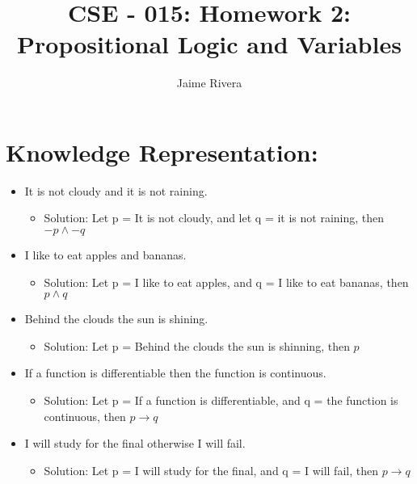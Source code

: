 \documentclass[11pt]{article}
\title{CSE - 015: Homework 2: Propositional Logic and Variables}
\author{Jaime Rivera}
\begin{document}
\maketitle

\section{Knowledge Representation:}

\begin{itemize}
\item It is not cloudy and it is not raining. 

\begin{itemize}
\item Solution: Let p = It is not cloudy, and let q = it is not raining, then $ -p \wedge -q$
 \end{itemize} 


\item I like to eat apples and bananas.

\begin{itemize}
\item Solution: Let p = I like to eat apples, and q = I like to eat bananas, then $p \wedge q$
 \end{itemize} 
 
\item Behind the clouds the sun is shining.

\begin{itemize}
\item Solution: Let p = Behind the clouds the sun is shinning, then  $ p  $
 \end{itemize} 
 
\item If a function is differentiable then the function is continuous. 

\begin{itemize}
\item Solution: Let p = If a function is differentiable, and q = the function is continuous, then $ p \to q $
 \end{itemize} 

 \item I will study for the final otherwise I will fail. 

\begin{itemize}
\item Solution: Let p =  I will study for the final, and q = I will fail, then $ p \to q $
 \end{itemize} 

\end{itemize}
\end{document}
